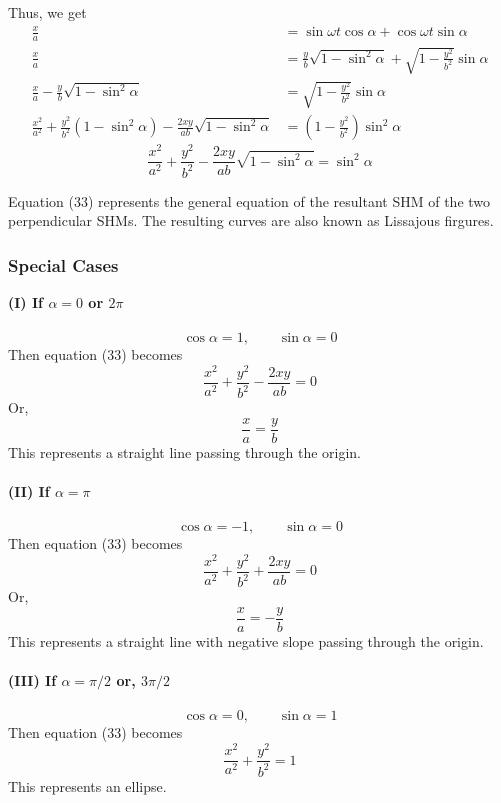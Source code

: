 \documentclass[12pt]{article}
\begin{document}
Thus, we get
\begin{align*}
    \frac{x}{a} &= \sin{\omega t}\cos{\alpha} + \cos{\omega t}\sin{\alpha} \\
    \frac{x}{a} &= \frac{y}{b} \sqrt{1 - \sin^2{\alpha}} + \sqrt{1 - \frac{y^2}{b^2}} \sin{\alpha} \\
    \frac{x}{a} - \frac{y}{b} \sqrt{1 - \sin^2{\alpha}} &= \sqrt{1 - \frac{y^2}{b^2}} \sin{\alpha} \\
    \frac{x^2}{a^2} + \frac{y^2}{b^2} (1 - \sin^2{\alpha}) - \frac{2xy}{ab} \sqrt{1 - \sin^2{\alpha}} &= \left( 1 - \frac{y^2}{b^2} \right) \sin^2{\alpha}
\end{align*}
\begin{equation}
    \boxed{ \frac{x^2}{a^2} + \frac{y^2}{b^2} - \frac{2xy}{ab} \sqrt{1 - \sin^2{\alpha}} = \sin^2{\alpha} }
\end{equation}

Equation (33) represents the general equation of the resultant SHM of the two perpendicular SHMs. The resulting curves are also known as Lissajous firgures.

\subsubsection{Special Cases}
\textbf{(I) If $\alpha=0$ or $2\pi$}\\~\\
\[ \cos{\alpha} = 1, \qquad \sin{\alpha} = 0 \]
Then equation (33) becomes \[
    \frac{x^2}{a^2} + \frac{y^2}{b^2} - \frac{2xy}{ab} = 0
\]
Or, \[
    \frac{x}{a} = \frac{y}{b}
\]
This represents a straight line passing through the origin.\\~\\


\textbf{(II) If $\alpha=\pi$}\\~\\
\[ \cos{\alpha} = -1, \qquad \sin{\alpha} = 0 \]
Then equation (33) becomes \[
    \frac{x^2}{a^2} + \frac{y^2}{b^2} + \frac{2xy}{ab} = 0
\]
Or, \[
    \frac{x}{a} = -\frac{y}{b}
\]
This represents a straight line with negative slope passing through the origin.\\~\\


\textbf{(III) If $\alpha=\pi/2$ or, $3\pi/2$}\\~\\
\[ \cos{\alpha} = 0, \qquad \sin{\alpha} = 1 \]
Then equation (33) becomes \[
    \frac{x^2}{a^2} + \frac{y^2}{b^2} = 1
\]
This represents an ellipse.\\~\\
\end{document}
